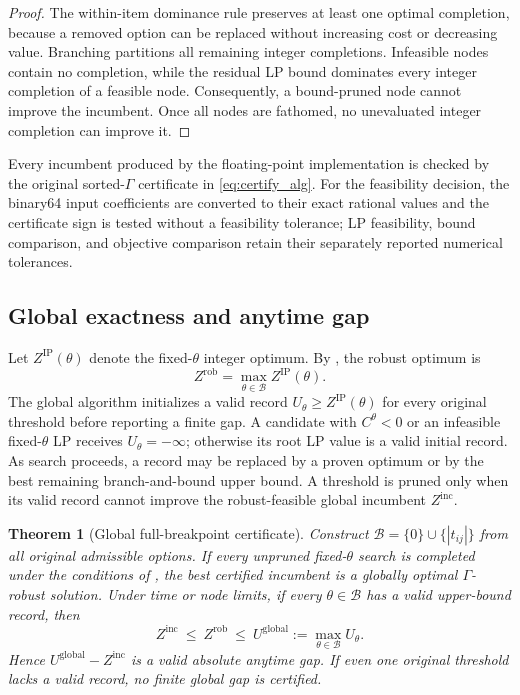 \documentclass[11pt, a4paper]{article}
\theoremstyle{plain}
\newtheorem{theorem}{Theorem}
\theoremstyle{definition}
\theoremstyle{remark}
\begin{document}
\begin{proof}
The within-item dominance rule preserves at least one optimal completion,
because a removed option can be replaced without increasing cost or decreasing
value.  Branching partitions all remaining integer completions.  Infeasible
nodes contain no completion, while the residual LP bound dominates every
integer completion of a feasible node.  Consequently, a bound-pruned node
cannot improve the incumbent.  Once all nodes are fathomed, no unevaluated
integer completion can improve it.
\end{proof}

Every incumbent produced by the floating-point implementation is checked by
the original sorted-$\Gamma$ certificate in \eqref{eq:certify_alg}.  For the
feasibility decision, the binary64 input coefficients are converted to their
exact rational values and the certificate sign is tested without a feasibility
tolerance; LP feasibility, bound comparison, and objective comparison retain
their separately reported numerical tolerances.

\subsection{Global exactness and anytime gap}\label{subsec:global_exact}

Let $Z^{\mathrm{IP}}(\theta)$ denote the fixed-$\theta$ integer optimum.  By
, the robust optimum is
\[
Z^{\mathrm{rob}}=\max_{\theta\in\mathcal B}Z^{\mathrm{IP}}(\theta).
\]
The global algorithm initializes a valid record $U_\theta\ge
Z^{\mathrm{IP}}(\theta)$ for every original threshold before reporting a
finite gap.  A candidate with $C^\theta<0$ or an infeasible fixed-$\theta$ LP
receives $U_\theta=-\infty$; otherwise its root LP value is a valid initial
record.  As search proceeds, a record may be replaced by a proven optimum or
by the best remaining branch-and-bound upper bound.  A threshold is pruned only
when its valid record cannot improve the robust-feasible global incumbent
$Z^{\mathrm{inc}}$.

\begin{theorem}[Global full-breakpoint certificate]\label{thm:global_exact}
Construct $\mathcal B=\{0\}\cup\{|t_{ij}|\}$ from all original admissible
options.  If every unpruned fixed-$\theta$ search is completed under the
conditions of , the best certified incumbent is a
globally optimal $\Gamma$-robust solution.  Under time or node limits, if every
$\theta\in\mathcal B$ has a valid upper-bound record, then
\[
 Z^{\mathrm{inc}}\ \le\ Z^{\mathrm{rob}}\ \le\
 U^{\mathrm{global}}:=\max_{\theta\in\mathcal B}U_\theta.
\]
Hence $U^{\mathrm{global}}-Z^{\mathrm{inc}}$ is a valid absolute anytime gap.
If even one original threshold lacks a valid record, no finite global gap is
certified.
\end{theorem}
\end{document}
